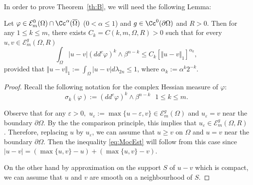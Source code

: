 In order to prove Theorem~\ref{th:B}, we will need the following Lemma:
\begin{lemma}\label{lem:ModC}
Let $\varphi\in \mathcal{E}^0_m(\Omega)\cap \Cc^{\alpha} (\overline\Omega)$ ($ 0 < \alpha \leq 1$) and $g \in \Cc^0 (\partial \Omega)$ and $R > 0$.
Then for any $1 \leq k\leq m$, there exists $C_k = C (k,m,\Omega,R) >0$ such that for every $u,v\in \mathcal{E}^g_m(\Omega,R)$
\begin{equation} \label{eq:MocEst}
\int_{\Omega}|u-v|(dd^c\varphi)^k\wedge\beta^{n-k}\leq C_k \left[\Vert u-v \Vert_1\right]^{\alpha_k},
\end{equation}
provided that $\Vert u-v \Vert_1:= \int_{\Omega} \vert u - v\vert d \lambda_{2 n} \leq 1$, where $\alpha_k:= \alpha^k 2^{-k}$.
\end{lemma}
\begin{proof}
Recall the following notation for the complex Hessian measure of $\varphi$:
\[
\sigma_k{(\varphi)}:= (dd^c\varphi)^k\wedge\beta^{n-k} \ \ \ 1 \leq k\leq m.
\]

Observe that for any $\varepsilon > 0,$ $ u_\varepsilon:= \max \{u - \varepsilon, v \} \in \mathcal{E}^g_m(\Omega)$ and $u_\varepsilon = v$ near the boundary $\partial \Omega$. By the the comparison principle, this implies that
$u_\varepsilon \in \mathcal{E}^g_m(\Omega,R)$. Therefore, replacing $u$ by $u_\varepsilon$, we can assume that $u \geq v$ on $\Omega$ and $u = v$ near the boundary $\partial \Omega$. Then the inequality \eqref{eq:MocEst} will follow from this case since $\vert u - v \vert = ( \max\{u,v\} - u) + (\max\{u,v\} - v)$.

On the other hand by approximation on the support $S$ of $u-v$ which is compact, we can assume that $u$ and $ v $ are smooth on a neighbourhood of $S$.


\end{proof}
